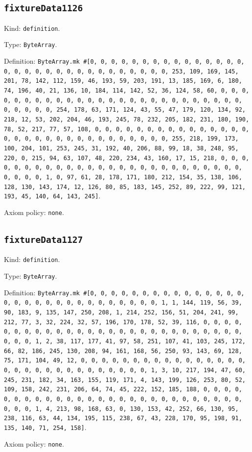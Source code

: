 \documentclass[11pt]{article}
\begin{document}
\subsection*{\texttt{fixtureData1126}}
\noindent Kind: \texttt{definition}.\par
\noindent Type: \texttt{ByteArray}.\par
\noindent Definition: \texttt{ByteArray.mk \#[0, 0, 0, 0, 0, 0, 0, 0, 0, 0, 0, 0, 0, 0, 0, 0, 0, 0, 0, 0, 0, 0, 0, 0, 0, 0, 0, 0, 0, 0, 0, 253, 109, 169, 145, 201, 78, 142, 112, 159, 46, 193, 59, 203, 191, 13, 185, 169, 6, 180, 74, 196, 40, 21, 136, 10, 184, 114, 142, 52, 36, 124, 58, 60, 0, 0, 0, 0, 0, 0, 0, 0, 0, 0, 0, 0, 0, 0, 0, 0, 0, 0, 0, 0, 0, 0, 0, 0, 0, 0, 0, 0, 0, 0, 0, 254, 178, 63, 171, 124, 43, 55, 47, 179, 120, 134, 92, 218, 12, 53, 202, 204, 46, 193, 245, 78, 232, 205, 182, 231, 180, 190, 78, 52, 217, 77, 57, 108, 0, 0, 0, 0, 0, 0, 0, 0, 0, 0, 0, 0, 0, 0, 0, 0, 0, 0, 0, 0, 0, 0, 0, 0, 0, 0, 0, 0, 0, 0, 0, 255, 218, 199, 173, 100, 204, 101, 253, 245, 31, 192, 40, 206, 88, 99, 18, 38, 248, 95, 220, 0, 215, 94, 63, 107, 48, 220, 234, 43, 160, 17, 15, 218, 0, 0, 0, 0, 0, 0, 0, 0, 0, 0, 0, 0, 0, 0, 0, 0, 0, 0, 0, 0, 0, 0, 0, 0, 0, 0, 0, 0, 0, 0, 1, 0, 97, 61, 28, 178, 171, 180, 212, 154, 35, 138, 106, 128, 130, 143, 174, 12, 126, 80, 85, 183, 145, 252, 89, 222, 99, 121, 193, 45, 140, 64, 143, 245]}.\par
\noindent Axiom policy: \texttt{none}.\par
\subsection*{\texttt{fixtureData1127}}
\noindent Kind: \texttt{definition}.\par
\noindent Type: \texttt{ByteArray}.\par
\noindent Definition: \texttt{ByteArray.mk \#[0, 0, 0, 0, 0, 0, 0, 0, 0, 0, 0, 0, 0, 0, 0, 0, 0, 0, 0, 0, 0, 0, 0, 0, 0, 0, 0, 0, 0, 0, 1, 1, 144, 119, 56, 39, 90, 183, 9, 135, 147, 250, 208, 1, 214, 252, 156, 51, 204, 241, 99, 212, 77, 3, 32, 224, 32, 57, 196, 170, 178, 52, 39, 116, 0, 0, 0, 0, 0, 0, 0, 0, 0, 0, 0, 0, 0, 0, 0, 0, 0, 0, 0, 0, 0, 0, 0, 0, 0, 0, 0, 0, 0, 0, 1, 2, 38, 117, 177, 41, 97, 58, 251, 107, 41, 103, 245, 172, 66, 82, 186, 245, 130, 208, 94, 161, 168, 56, 250, 93, 143, 69, 128, 75, 171, 104, 49, 12, 0, 0, 0, 0, 0, 0, 0, 0, 0, 0, 0, 0, 0, 0, 0, 0, 0, 0, 0, 0, 0, 0, 0, 0, 0, 0, 0, 0, 0, 0, 1, 3, 10, 217, 194, 47, 60, 245, 231, 182, 34, 163, 155, 119, 171, 4, 143, 199, 126, 253, 80, 52, 109, 158, 242, 231, 206, 64, 74, 45, 222, 152, 185, 188, 0, 0, 0, 0, 0, 0, 0, 0, 0, 0, 0, 0, 0, 0, 0, 0, 0, 0, 0, 0, 0, 0, 0, 0, 0, 0, 0, 0, 0, 0, 1, 4, 213, 98, 168, 63, 0, 130, 153, 42, 252, 66, 130, 95, 238, 116, 63, 44, 134, 195, 115, 238, 67, 43, 228, 170, 95, 198, 91, 135, 140, 71, 254, 158]}.\par
\noindent Axiom policy: \texttt{none}.\par
\end{document}
